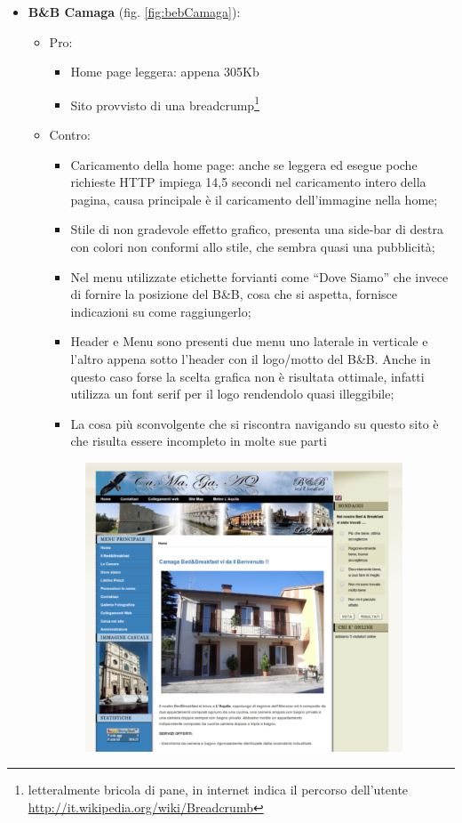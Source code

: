 \documentclass[a4paper,12pt,hidelinks]{report}
\begin{document}
  \begin{itemize}
    \item \textbf{B\&B Camaga} (fig. \ref{fig:bebCamaga}): 
      \begin{itemize}
	\item Pro:
	  \begin{itemize}
	    \item Home page leggera: appena 305Kb
	    \item Sito provvisto di una breadcrump\footnote{letteralmente bricola di pane,
	    in internet indica il percorso dell'utente \url{http://it.wikipedia.org/wiki/Breadcrumb}}
	  \end{itemize}
	\item Contro:
	  \begin{itemize}
	    \item Caricamento della home page: anche se leggera ed esegue poche richieste HTTP impiega 14,5 secondi nel caricamento intero della pagina, causa principale è il 
	    caricamento dell'immagine nella home;
	    \item Stile di non gradevole effetto grafico, presenta una side-bar di destra con colori non conformi allo stile, che sembra quasi una pubblicità;
	    \item Nel menu utilizzate etichette forvianti come ``Dove Siamo'' che invece di fornire la posizione del B\&B, cosa che si aspetta, fornisce indicazioni su come 
	    raggiungerlo;
	    \item Header e Menu sono presenti due menu uno laterale in verticale e l'altro appena sotto l'header con il logo/motto del B\&B. Anche in questo caso forse la scelta 
	    grafica non è risultata ottimale, infatti utilizza un font serif per il logo rendendolo quasi illeggibile;
	    \item La cosa più sconvolgente che si riscontra navigando su questo sito è che risulta essere incompleto in molte sue parti
	  \end{itemize}
	  \begin{figure}[h!]%
	    \includegraphics[width=0.95\textwidth,keepaspectratio=true]{img/bebCamaga}

\end{figure}
\end{itemize}
\end{itemize}
\end{document}
